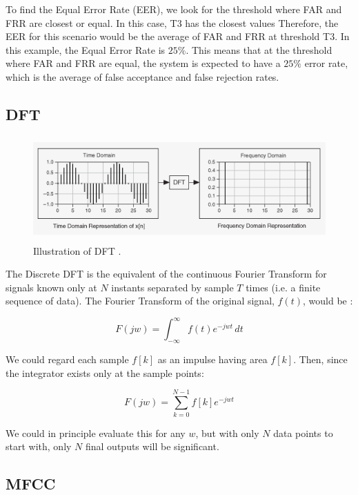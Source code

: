 To find the Equal Error Rate (EER), we look for the threshold where FAR and FRR are closest or equal. In this case, T3 has the closest values Therefore, the EER for this scenario would be the average of FAR and FRR at threshold T3. In this example, the Equal Error Rate is $25\%$. This means that at the threshold where FAR and FRR are equal, the system is expected to have a $25\%$ error rate, which is the average of false acceptance and false rejection rates.

\subsection{\acl{DFT}}

\begin{figure}[htbp!]
    \centering
    \includegraphics[height=4cm]{figures/dft.png}
    \caption{ Illustration of \ac{DFT} \cite{roberts2003lecture}.}
    \label{fig:dft}
\end{figure}

The Discrete \ac{DFT} is the equivalent of the continuous Fourier Transform for signals known only at $N$ instants separated by sample $T$ times (i.e. a finite sequence of data). The Fourier Transform of the original signal, $f(t)$, would be \cite{roberts2003lecture}:

\begin{equation}
    F(jw) = \int_{-\infty}^{\infty} f(t)e^{-jwt} \,dt
\end{equation}

We could regard each sample $f[k]$ as an impulse having area $f[k]$. Then, since the integrator exists only at the sample points:

\begin{equation}
    F(jw) = \sum_{k=0}^{N-1} f[k]e^{-jwt}
\end{equation}

We could in principle evaluate this for any $w$, but with only $N$ data points to start with, only $N$ final outputs will be significant\cite{roberts2003lecture}.

\subsection{\acl{MFCC}}

